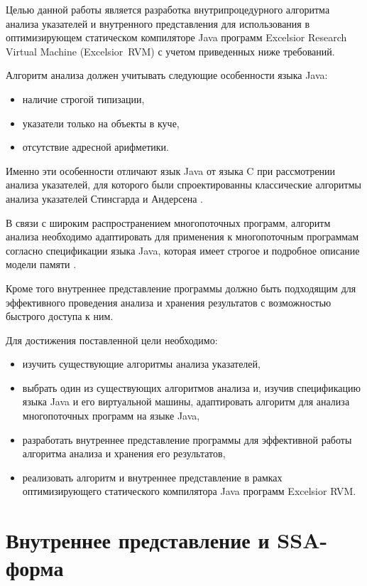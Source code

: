 \documentclass[14pt,titlepage]{extarticle}
\newcommand{\eng}[1]{{\English#1}}
\let\oldsection\section
\renewcommand{\section}{\newpage\oldsection}
\begin{document}
    Целью данной работы является разработка внутрипроцедурного алгоритма
    анализа указателей и внутренного представления для использования в
    оптимизирующем статическом компиляторе Java программ
    \eng{Excelsior Research Virtual Machine (Excelsior~RVM)}
    \cite{excelsior_jet} с учетом приведенных ниже требований.

    Алгоритм анализа должен учитывать следующие особенности языка Java:
    \begin{itemize}
      \item наличие строгой типизации,
      \item указатели только на объекты в куче,
      \item отсутствие адресной арифметики.
    \end{itemize}
    Именно эти особенности отличают язык Java от языка C при рассмотрении
    анализа указателей, для которого были спроектированны классические
    алгоритмы анализа указателей Стинсгарда \cite{steensgaard} и Андерсена
    \cite{andersen}.

    В связи с широким распространением многопоточных программ, алгоритм анализа
    необходимо адаптировать для применения к многопоточным программам согласно
    спецификации языка Java, которая имеет строгое и подробное описание модели
    памяти \cite{manson_jmm}.

    Кроме того внутреннее представление программы должно быть подходящим для
    эффективного проведения анализа и хранения результатов с возможностью
    быстрого доступа к ним.

    Для достижения поставленной цели необходимо:
    \begin{itemize}
      \item изучить существующие алгоритмы анализа указателей,
      \item выбрать один из существующих алгоритмов анализа и, изучив
            спецификацию языка Java и его виртуальной машины, адаптировать
            алгоритм для анализа многопоточных программ на языке Java,
      \item разработать внутреннее представление программы для эффективной
            работы алгоритма анализа и хранения его результатов,
      \item реализовать алгоритм и внутреннее представление в рамках
            оптимизирующего статического компилятора Java программ
            \eng{Excelsior RVM}.
    \end{itemize}

  \section{Внутреннее представление и SSA-форма}
    \label{section:ir_and_ssa}
\end{document}
